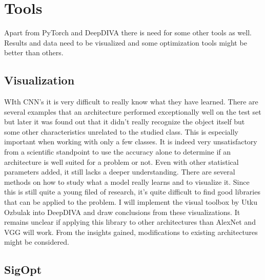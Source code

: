\section{Tools}

Apart from PyTorch and DeepDIVA there is need for some other tools as well. Results and data need to be visualized and some optimization tools might be better than others.

\subsection{Visualization}

WIth CNN's it is very difficult to really know what they have learned. There are several examples that an architecture performed exceptionally well on the test set but later it was found out that it didn't really recognize the object itself but some other characteristics unrelated to the studied class. This is especially important when working with only a few classes. It is indeed very unsatisfactory from a scientific standpoint to use the accuracy alone to determine if an architecture is well suited for a problem or not. Even with other statistical parameters added, it still lacks a deeper understanding. There are several methods on how to study what a model really learns and to visualize it. Since this is still quite a young filed of research, it's quite difficult to find good libraries that can be applied to the problem. I will implement the visual toolbox by Utku Ozbulak \cite{viztoolbox} into DeepDIVA and draw conclusions from these visualizations. It remains unclear if applying this library to other architectures than AlexNet and VGG will work. From the insights gained, modifications to existing architectures might be considered. 

\subsection{SigOpt}


